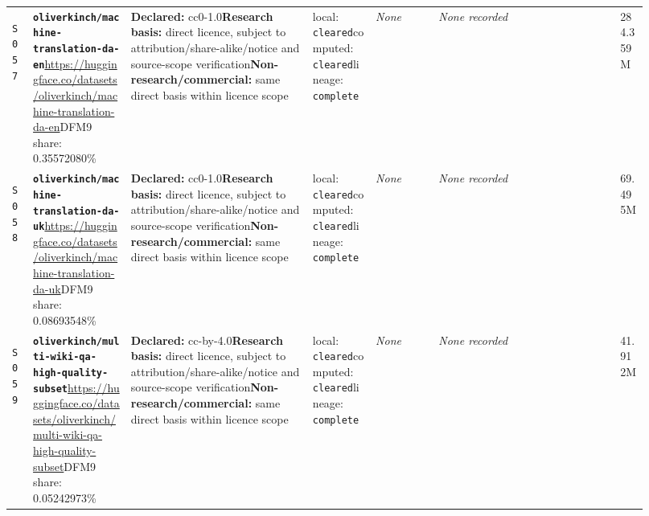 \documentclass[9pt,a4paper]{article}
\newcommand{\srcid}[1]{\hypertarget{src:#1}{\texttt{#1}}}
\begin{document}
\begin{landscape}
\begin{longtable}{@{}L{0.03\linewidth}L{0.14\linewidth}L{0.26\linewidth}L{0.09\linewidth}L{0.09\linewidth}L{0.265\linewidth}L{0.045\linewidth}@{}}
\srcid{S057} & \textbf{\nolinkurl{oliverkinch/machine-translation-da-en}}\newline \url{https://huggingface.co/datasets/oliverkinch/machine-translation-da-en}\newline DFM9 share: 0.35572080\% & \textbf{Declared:} cc0-1.0\newline \textbf{Research basis:} direct licence, subject to attribution/share-alike/notice and source-scope verification\newline \textbf{Non-research/commercial:} same direct basis within licence scope & local: \texttt{cleared}\newline computed: \texttt{cleared}\newline lineage: \texttt{complete} & \textit{None} & \textit{None recorded} & 284.359M \\
\srcid{S058} & \textbf{\nolinkurl{oliverkinch/machine-translation-da-uk}}\newline \url{https://huggingface.co/datasets/oliverkinch/machine-translation-da-uk}\newline DFM9 share: 0.08693548\% & \textbf{Declared:} cc0-1.0\newline \textbf{Research basis:} direct licence, subject to attribution/share-alike/notice and source-scope verification\newline \textbf{Non-research/commercial:} same direct basis within licence scope & local: \texttt{cleared}\newline computed: \texttt{cleared}\newline lineage: \texttt{complete} & \textit{None} & \textit{None recorded} & 69.495M \\
\srcid{S059} & \textbf{\nolinkurl{oliverkinch/multi-wiki-qa-high-quality-subset}}\newline \url{https://huggingface.co/datasets/oliverkinch/multi-wiki-qa-high-quality-subset}\newline DFM9 share: 0.05242973\% & \textbf{Declared:} cc-by-4.0\newline \textbf{Research basis:} direct licence, subject to attribution/share-alike/notice and source-scope verification\newline \textbf{Non-research/commercial:} same direct basis within licence scope & local: \texttt{cleared}\newline computed: \texttt{cleared}\newline lineage: \texttt{complete} & \textit{None} & \textit{None recorded} & 41.912M \\

\end{longtable}
\end{landscape}
\end{document}
